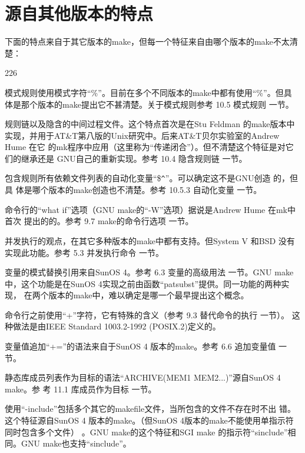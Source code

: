 \section{源自其他版本的特点}

下面的特点来自于其它版本的make，但每一个特征来自由哪个版本的make不太清楚：

\begin{dinglist}{226}
\itemsep=4pt

\item 模式规则使用模式字符“\%”。目前在多个不同版本的make中都有使用“\%”。但具
    体是那个版本的make提出它不甚清楚。关于模式规则参考  10.5 模式规则 一节。

\item 规则链以及隐含的中间过程文件。这个特点首次是在Stu Feldman 的make版本中
    实现，并用于AT\&T第八版的Unix研究中。后来AT\&T贝尔实验室的Andrew Hume 在它
    的mk程序中应用（这里称为“传递闭合”）。但不清楚这个特征是对它们的继承还是
    GNU自己的重新实现。参考 10.4 隐含规则链 一节。

\item 包含规则所有依赖文件列表的自动化变量“\$\verb"^"”。可以确定这不是GNU创造
    的，但
    具
    体是哪个版本的make创造也不清楚。参考 10.5.3 自动化变量 一节。

\item 命令行的“what if”选项（GNU make的“-W”选项）据说是Andrew Hume 在mk中首次
    提出的的。参考 9.7 make的命令行选项 一节。

\item  并发执行的观点，在其它多种版本的make中都有支持。但System V 和BSD 没有
    实现此功能。参考 5.3 并发执行命令 一节。

\item 变量的模式替换引用来自SunOS 4。参考 6.3 变量的高级用法 一节。GNU make
    中，这个功能是在SunOS 4实现之前由函数“patsubst”提供。同一功能的两种实现，
    在两个版本的make中，难以确定是哪一个最早提出这个概念。

\item 命令行之前使用“+”字符，它有特殊的含义（参考 9.3 替代命令的执行 一节）。
    这种做法是由IEEE Standard 1003.2-1992 (POSIX.2)定义的。

\item 变量值追加“+=”的语法来自于SunOS 4 版本的make。参考 6.6 追加变量值 一
    节。

\item 静态库成员列表作为目标的语法“ARCHIVE(MEM1 MEM2...)”源自SunOS 4 make。参
    考 11.1 库成员作为目标 一节。

\item 使用“-include”包括多个其它的makefile文件，当所包含的文件不存在时不出
    错。这个特征源自SunOS 4 版本的make。（但SunOS 4版本的make不能使用单指示符
    同时包含多个文件） 。GNU make的这个特征和SGI make 的指示符“sinclude”相
    同。GNU make也支持“sinclude”。

\end{dinglist}


